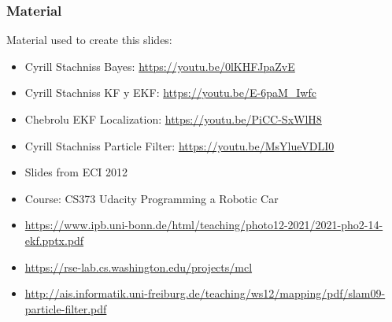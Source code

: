 \begin{frame}
    \frametitle{Material}
    
    Material used to create this slides:
    \begin{itemize}
        \item Cyrill Stachniss Bayes: \url{https://youtu.be/0lKHFJpaZvE} 
        \item Cyrill Stachniss KF y EKF: \url{https://youtu.be/E-6paM_Iwfc}
        \item Chebrolu EKF Localization: \url{https://youtu.be/PiCC-SxWlH8}
        \item Cyrill Stachniss Particle Filter: \url{https://youtu.be/MsYlueVDLI0}
        \item Slides from ECI 2012
        \item Course: CS373 Udacity Programming a Robotic Car
        \item \url{https://www.ipb.uni-bonn.de/html/teaching/photo12-2021/2021-pho2-14-ekf.pptx.pdf}
        \item \url{https://rse-lab.cs.washington.edu/projects/mcl}
        \item \url{http://ais.informatik.uni-freiburg.de/teaching/ws12/mapping/pdf/slam09-particle-filter.pdf}
    \end{itemize}
    
\end{frame}

